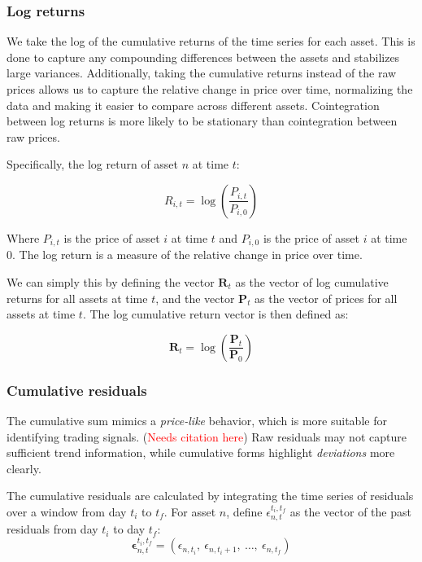 \documentclass[12pt]{article}
\begin{document}
\subsubsection{Log returns}

We take the log of the cumulative returns of the time series for each asset. This is done to capture any compounding differences between the assets and stabilizes large variances. Additionally, taking the cumulative returns instead of the raw prices allows us to capture the relative change in price over time, normalizing the data and making it easier to compare across different assets. Cointegration between log returns is more likely to be stationary than cointegration between raw prices.

\vspace{10pt}
\noindent
Specifically, the log return of asset $n$ at time $t$:

\begin{equation}
    R_{i,t} = \log\left( \frac{P_{i,t}}{P_{i,0}} \right)
    \label{eq:log_cumulative_return}
\end{equation}

\noindent
Where $P_{i,t}$ is the price of asset $i$ at time $t$ and $P_{i,0}$ is the price of asset $i$ at time $0$. The log return is a measure of the relative change in price over time.

\noindent
We can simply this by defining the vector $\mathbf{R}_t$ as the vector of log cumulative returns for all assets at time $t$, and the vector $\mathbf{P}_t$ as the vector of prices for all assets at time $t$. The log cumulative return vector is then defined as:

\begin{equation}
    \mathbf{R}_t = \log\left( \frac{\mathbf{P}_t}{\mathbf{P}_0} \right)
    \label{eq:log_cumulative_return_vector}
\end{equation}

\subsubsection{Cumulative residuals}

The cumulative sum mimics a \textit{price-like} behavior, which is more suitable for identifying trading signals. (\textcolor{red}{Needs citation here}) Raw residuals may not capture sufficient trend information, while cumulative forms highlight \textit{deviations} more clearly.

\vspace{10pt}
\noindent
The cumulative residuals are calculated by integrating the time series of residuals over a window from day $t_{i}$ to $t_{f}$. For asset $n$, define $\epsilon^{t_i,t_f}_{n,t}$ as the vector of the past residuals from day $t_{i}$ to day $t_{f}$:
\begin{equation}
    \mathbf{\epsilon}^{t_i,t_f}_{n,t} = \left( \epsilon_{n,t_i},\ \epsilon_{n,t_i+1},\ \ldots,\ \epsilon_{n,t_f} \right)
    \label{eq:residual_vector}
\end{equation}
\end{document}
